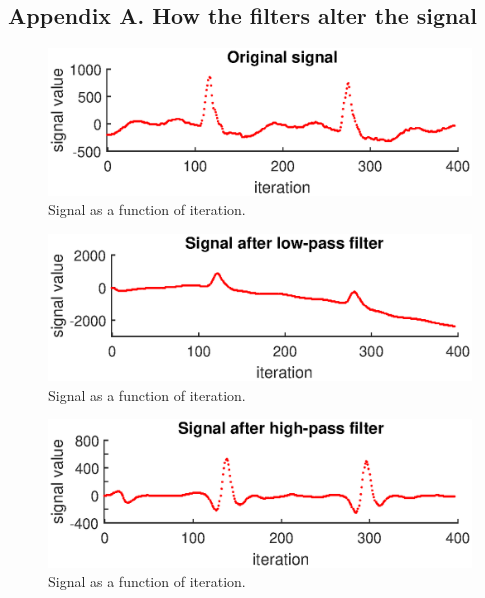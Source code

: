 
\subsection{Appendix A. How the filters alter the signal}
\label{Apx:A}

\begin{figure}[H]
    \centering
    \includegraphics[width=1.0\textwidth]{Appendix/fig/1original.eps}
    \caption{Signal as a function of iteration.}
    \label{fig:1original}
\end{figure}

\begin{figure}[H]
    \centering
    \includegraphics[width=1.0\textwidth]{Appendix/fig/2afterLowPass.eps}
    \caption{Signal as a function of iteration.}
    \label{fig:2afterLowPass}
\end{figure}

\begin{figure}[H]
    \centering
    \includegraphics[width=1.0\textwidth]{Appendix/fig/3afterHighPass.eps}
    \caption{Signal as a function of iteration.}
    \label{fig:3afterHighPass}
\end{figure}

